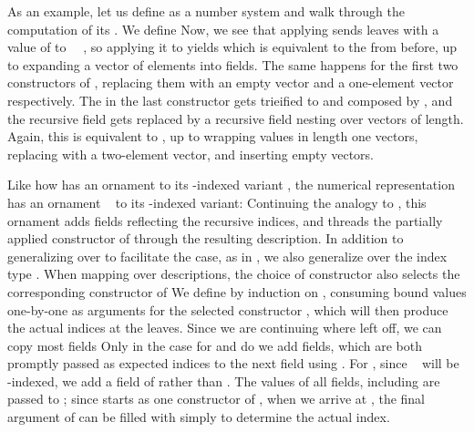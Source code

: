 As an example, let us define  as a number system and walk through the computation of its . We define
Now, we see that applying  sends leaves with a value of  to \ \ , so applying it to  yields
which is equivalent to the  from before, up to expanding a vector of  elements into  fields. The same happens for the first two constructors of , replacing them with an empty vector and a one-element vector respectively. The  in the last constructor gets trieified to  and composed by , and the recursive field gets replaced by a recursive field nesting over vectors of length. Again, this is equivalent to , up to wrapping values in length one vectors, replacing  with a two-element vector, and inserting empty vectors.



Like how  has an ornament  to its \bN{}-indexed variant , the numerical representation \  has an ornament \  to its -indexed variant:
Continuing the analogy to , this ornament adds fields reflecting the recursive indices, and threads the partially applied constructor  of  through the resulting description. In addition to generalizing over  to facilitate the  case, as in , we also generalize over the index type . When mapping over descriptions, the choice of constructor also selects the corresponding constructor of 
We define  by induction on , consuming bound values one-by-one as arguments for the selected constructor , which will then produce the actual indices at the leaves. Since we are continuing where  left off, we can copy most fields
Only in the case for  and  do we add fields, which are both promptly passed as expected indices to the next field using . For , since \  will be -indexed, we add a field of  rather than . The values of all fields, including  are passed to ; since  starts as one constructor  of , when we arrive at , the final argument of  can be filled with simply  to determine the actual index.

